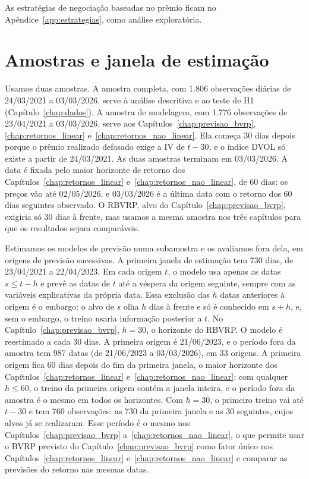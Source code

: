 As estratégias de negociação baseadas no prêmio ficam no
Apêndice~\ref{app:estrategias}, como análise exploratória.

\section{Amostras e janela de estimação}
\label{sec:met-amostras}

Usamos duas amostras. A amostra completa, com 1.806 observações
diárias de 24/03/2021 a 03/03/2026, serve à análise descritiva e ao teste de H1
(Capítulo~\ref{chap:dados}). A amostra de modelagem, com 1.776 observações de
23/04/2021 a 03/03/2026, serve aos Capítulos~\ref{chap:previsao_bvrp},
\ref{chap:retornos_linear} e~\ref{chap:retornos_nao_linear}. Ela começa 30 dias depois porque
o prêmio realizado defasado exige a IV de $t-30$, e o índice DVOL só existe a
partir de 24/03/2021. As duas amostras terminam em 03/03/2026. A data é fixada
pelo maior horizonte de retorno dos Capítulos~\ref{chap:retornos_linear}
e~\ref{chap:retornos_nao_linear}, de 60 dias: os preços vão até 02/05/2026, e
03/03/2026 é a última data com o retorno dos 60 dias seguintes observado. O
RBVRP, alvo do Capítulo~\ref{chap:previsao_bvrp}, exigiria só 30 dias à
frente, mas usamos a mesma amostra nos três capítulos para que os
resultados sejam comparáveis.

Estimamos os modelos de previsão numa subamostra e os avaliamos fora
dela, em origens de previsão sucessivas. A primeira janela de estimação tem 730 dias,
de 23/04/2021 a 22/04/2023. Em cada origem $t$, o modelo usa apenas
as datas $s \le t - h$ e prevê as datas de $t$ até a véspera da origem
seguinte, sempre com as variáveis explicativas da própria data. Essa exclusão
das $h$ datas anteriores à origem é o embargo: o alvo de $s$ olha $h$ dias à
frente e só é conhecido em $s + h$, e, sem o embargo, o treino usaria
informação posterior a $t$. No
Capítulo~\ref{chap:previsao_bvrp}, $h = 30$, o horizonte do RBVRP. O modelo é
reestimado a cada 30 dias. A primeira origem é 21/06/2023, e o período fora da
amostra tem 987 datas (de 21/06/2023 a 03/03/2026), em 33 origens. A primeira
origem fica 60 dias depois do fim da primeira janela, o maior horizonte dos
Capítulos~\ref{chap:retornos_linear} e~\ref{chap:retornos_nao_linear}: com
qualquer $h \le 60$, o treino da primeira origem contém a janela inteira, e o
período fora da amostra é o mesmo em todos os horizontes. Com $h = 30$, o
primeiro treino vai até $t - 30$ e tem 760 observações: as 730 da primeira
janela e as 30 seguintes, cujos alvos já se realizaram. Esse período
é o mesmo nos Capítulos~\ref{chap:previsao_bvrp} a~\ref{chap:retornos_nao_linear}, o que
permite usar o BVRP previsto do Capítulo~\ref{chap:previsao_bvrp} como fator
único nos Capítulos~\ref{chap:retornos_linear} e~\ref{chap:retornos_nao_linear}
e comparar as previsões do retorno nas mesmas datas.

